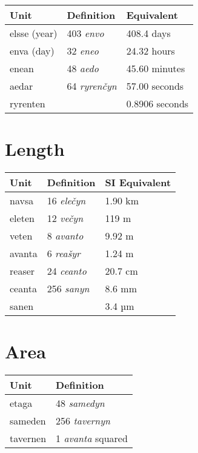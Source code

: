 \documentclass{book}
\begin{document}
\begin{center}
	\begin{tabular}{|l|l|l|}
		\hline
		Unit & Definition & Equivalent \\ \hline
		elsse (year) & 403 \emph{envo} & 408.4 days \\
		enva (day) & 32 \emph{eneo} & 24.32 hours \\
		enean & 48 \emph{aedo} & 45.60 minutes \\
		aedar & 64 \emph{ryrenčyn} & 57.00 seconds \\
		ryrenten & & 0.8906 seconds \\ \hline
	\end{tabular}
\end{center}

\section{Length}

\begin{center}
	\begin{tabular}{|l|l|l|}
		\hline
		Unit & Definition & SI Equivalent \\ \hline
		navsa & 16 \emph{elečyn} & 1.90 km \\
		eleten & 12 \emph{večyn} & 119 m \\
		veten & 8 \emph{avanto} & 9.92 m \\
		avanta & 6 \emph{reašyr} & 1.24 m \\
		reaser & 24 \emph{ceanto} & 20.7 cm \\
		ceanta & 256 \emph{sanyn} & 8.6 mm \\
		sanen & & 3.4 µm \\ \hline
	\end{tabular}
\end{center}

\section{Area}

\begin{center}
	\begin{tabular}{|l|l|}
		\hline
		Unit & Definition \\ \hline
		etaga & 48 \emph{samedyn} \\
		sameden & 256 \emph{tavernyn} \\
		tavernen & 1 \emph{avanta} squared \\ \hline
	\end{tabular}
\end{center}
\end{document}
